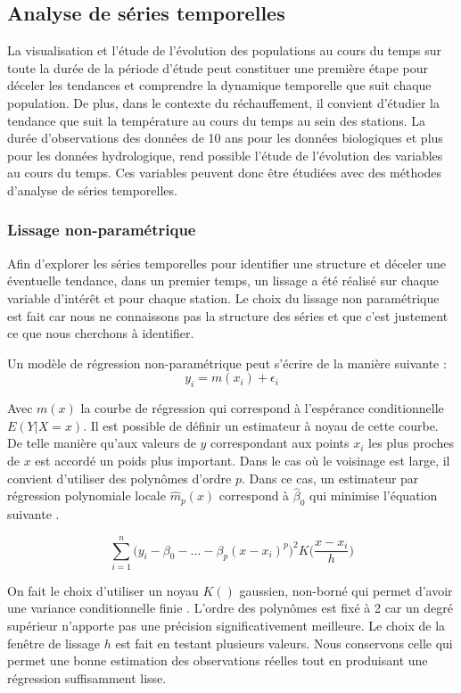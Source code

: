 \documentclass[12pt]{article}
\begin{document}
\subsection{Analyse de séries temporelles}

La visualisation et l’étude de l’évolution des populations au cours du temps sur toute la durée de la période d’étude peut constituer une première étape pour déceler les  tendances et comprendre la dynamique temporelle que suit chaque population. De plus, dans le contexte du réchauffement, il convient d’étudier la tendance que suit la température au cours du temps au sein des stations. La durée d’observations des données de 10 ans pour les données biologiques et plus pour les données hydrologique, rend possible l’étude de l’évolution des variables au cours du temps. Ces variables peuvent donc être étudiées avec des méthodes d’analyse de séries temporelles. 

\subsubsection{Lissage non-paramétrique}

Afin d'explorer les séries temporelles pour identifier une structure et déceler une éventuelle tendance, dans un premier temps, un lissage a été réalisé sur chaque variable d’intérêt et pour chaque station. Le choix du lissage non paramétrique est fait car nous ne connaissons pas la structure des séries et que c’est justement ce que nous cherchons à identifier.

Un modèle de régression non-paramétrique peut s'écrire de la manière suivante : 
\[y_i=m(x_i) + \epsilon_i\]

Avec $m(x)$ la courbe de régression qui correspond à l'espérance conditionnelle $E(Y|X=x)$. Il est possible de définir un estimateur à noyau de cette courbe. De telle manière qu’aux valeurs de $y$ correspondant aux points $x_i$ les plus proches de $x$ est accordé un poids plus important. Dans le cas où le voisinage est large, il convient d'utiliser des polynômes d’ordre $p$. Dans ce cas, un estimateur par régression polynomiale locale $\hat{m}_p(x)$ correspond à  $\hat{\beta}_0$ qui minimise l’équation suivante \citep{Simonoff1996}.

\[\sum_{i=1}^n\big(y_i-\beta_0-...-\beta_p(x-x_i)^p\big)^2K\Big(\frac{x-x_i}{h}\Big)\]

On fait le choix d'utiliser un noyau $K()$ gaussien, non-borné qui permet d'avoir une variance conditionnelle finie \citep{Simonoff1996}. L'ordre des polynômes est fixé à 2 car un degré supérieur n'apporte pas une précision significativement meilleure. Le choix de la fenêtre de lissage $h$ est fait en testant plusieurs valeurs. Nous conservons celle qui permet une bonne estimation des observations réelles tout en produisant une régression suffisamment lisse. 
\end{document}
